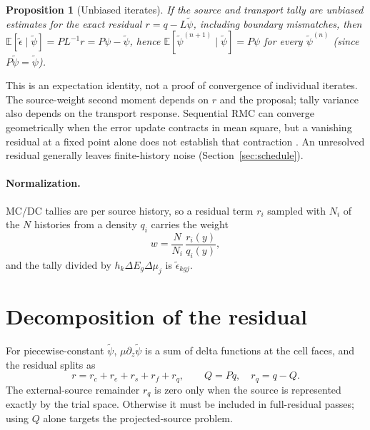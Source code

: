 \documentclass[11pt]{article}
\newtheorem{proposition}{Proposition}
\newcommand{\E}{\mathbb{E}}
\newcommand{\tpsi}{\tilde\psi}
\newcommand{\teps}{\tilde\epsilon}
\begin{document}
\begin{proposition}[Unbiased iterates]
If the source and transport tally are unbiased estimates for the exact residual
$r=q-L\tpsi$, including boundary mismatches, then
$\E[\teps\mid\tpsi]=P L^{-1} r = P\psi-\tpsi$, hence
$\E[\tpsi^{(n+1)}\mid\tpsi]=P\psi$ for every
$\tpsi^{(n)}$ (since $P\tpsi=\tpsi$).
\end{proposition}

This is an expectation identity, not a proof of convergence of individual iterates.
The source-weight second moment depends on $r$ and the proposal; tally variance also
depends on the transport response. Sequential RMC can converge geometrically when
the error update contracts in mean square, but a vanishing residual at a fixed point
alone does not establish that contraction \cite{peterson,vermaak}. An unresolved
residual generally leaves finite-history noise (Section~\ref{sec:schedule}).

\paragraph{Normalization.} MC/DC tallies are per source history, so a residual term
$r_i$ sampled with $N_i$ of the $N$ histories from a density $q_i$ carries the weight
\begin{equation}
  w = \frac{N}{N_i}\,\frac{r_i(y)}{q_i(y)} ,
  \label{eq:weight}
\end{equation}
and the tally divided by $h_k\Delta E_g\Delta\mu_j$ is $\teps_{kgj}$.

\section{Decomposition of the residual}

For piecewise-constant $\tpsi$, $\mu\partial_z\tpsi$ is a sum of delta functions at
the cell faces, and the residual splits as
\begin{equation}
  r = r_c + r_e + r_s + r_f + r_q,\qquad Q=Pq,\quad r_q=q-Q .
\end{equation}
The external-source remainder $r_q$ is zero only when the source is represented
exactly by the trial space. Otherwise it must be included in full-residual passes;
using $Q$ alone targets the projected-source problem.
\end{document}
